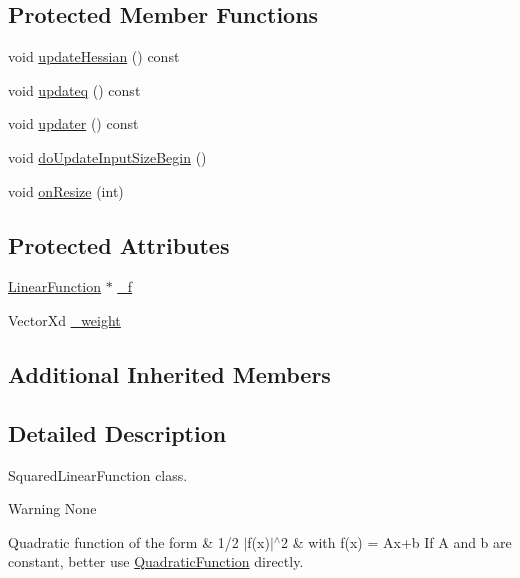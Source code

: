 \subsection*{Protected Member Functions}
\begin{DoxyCompactItemize}
\item 
void \hyperlink{classocra_1_1SquaredLinearFunction_a194606ccd86f17dbc73a6c3bdf2455c9}{update\+Hessian} () const
\item 
void \hyperlink{classocra_1_1SquaredLinearFunction_a6fec3532febfdea70c28457ea826111e}{updateq} () const
\item 
void \hyperlink{classocra_1_1SquaredLinearFunction_ab74b479275839850f1c98ac2fa3137bd}{updater} () const
\item 
void \hyperlink{classocra_1_1SquaredLinearFunction_a95faea59867ec734fbdb46d936067d77}{do\+Update\+Input\+Size\+Begin} ()
\item 
void \hyperlink{classocra_1_1SquaredLinearFunction_a9e6a87607548f1f1eac56eecfc1b05b5}{on\+Resize} (int)
\end{DoxyCompactItemize}
\subsection*{Protected Attributes}
\begin{DoxyCompactItemize}
\item 
\hyperlink{classocra_1_1LinearFunction}{Linear\+Function} $\ast$ \hyperlink{classocra_1_1SquaredLinearFunction_a9848211537e6dc386ab237e6a1e233dc}{\+\_\+f}
\item 
Vector\+Xd \hyperlink{classocra_1_1SquaredLinearFunction_ad21985a66257244ce79648a507ad5220}{\+\_\+weight}
\end{DoxyCompactItemize}
\subsection*{Additional Inherited Members}


\subsection{Detailed Description}
Squared\+Linear\+Function class. 

\begin{DoxyWarning}{Warning}
None
\end{DoxyWarning}
Quadratic function of the form \& 1/2 $|$f(x)$|$$^\wedge$2 \& with f(x) = Ax+b If A and b are constant, better use \hyperlink{classocra_1_1QuadraticFunction}{Quadratic\+Function} directly.

